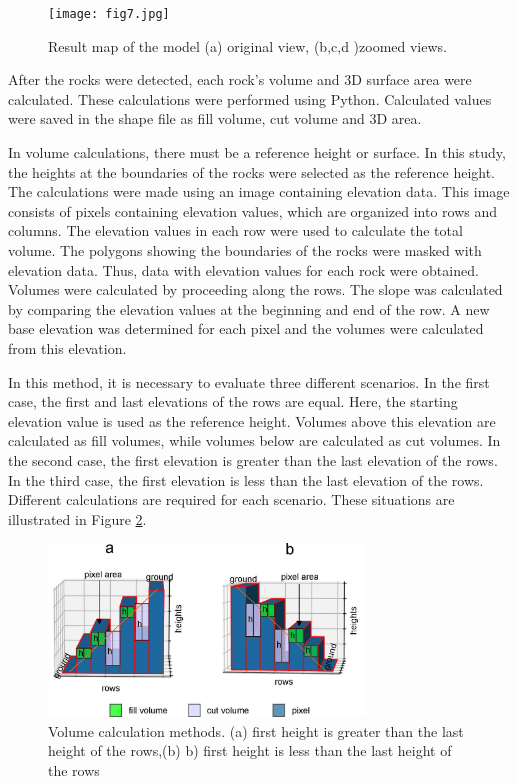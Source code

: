\documentclass[a4paper,fleqn]{cas-sc}
\begin{document}
\begin{figure}
	\centering
	\texttt{[image: fig7.jpg]}
	\caption{Result map of the model (a) original view, (b,c,d )zoomed views.}
	\label{fig:Figure7}
\end{figure}

After the rocks were detected, each rock's volume and 3D surface area were calculated. These calculations were performed using Python. Calculated values were saved in the shape file as fill volume, cut volume and 3D area.

In volume calculations, there must be a reference height or surface. In this study, the heights at the boundaries of the rocks were selected as the reference height. The calculations were made using an image containing elevation data. This image consists of pixels containing elevation values, which are organized into rows and columns. The elevation values in each row were used to calculate the total volume. The polygons showing the boundaries of the rocks were masked with elevation data. Thus, data with elevation values for each rock were obtained. Volumes were calculated by proceeding along the rows. The slope was calculated by comparing the elevation values at the beginning and end of the row. A new base elevation was determined for each pixel and the volumes were calculated from this elevation.

In this method, it is necessary to evaluate three different scenarios. In the first case, the first and last elevations of the rows are equal. Here, the starting elevation value is used as the reference height. Volumes above this elevation are calculated as fill volumes, while volumes below are calculated as cut volumes. In the second case, the first elevation is greater than the last elevation of the rows. In the third case, the first elevation is less than the last elevation of the rows. Different calculations are required for each scenario. These situations are illustrated in Figure \ref{fig:Figure8}.
\begin{figure}
	\centering
	\includegraphics[width=0.75\textwidth]{fig8.jpg}
	\caption{Volume calculation methods. (a) first height is greater than the last height of the rows,(b) b) first height is less than the last height of the rows}
	\label{fig:Figure8}
\end{figure}
\end{document}
